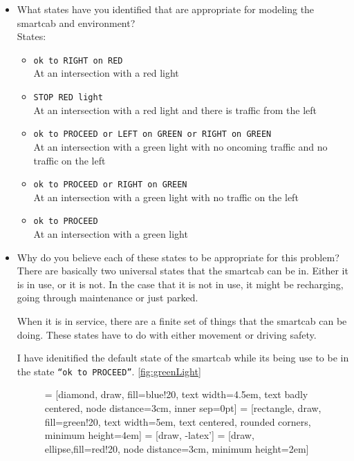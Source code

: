 \documentclass[twoside,openright,titlepage,numbers=noenddot,headinclude,%
               footinclude=true,cleardoublepage=empty,abstractoff,BCOR=5mm,%
               paper=a4,fontsize=11pt,ngerman,american]{scrreprt}
\numberwithin{theorem}{chapter}
\numberwithin{definition}{chapter}
\numberwithin{algorithm}{chapter}
\numberwithin{figure}{chapter}
\numberwithin{table}{chapter}
\numberwithin{equation}{chapter}
\begin{document}
\begin{itemize}
\item What states have you identified that are appropriate for modeling the smartcab and environment?\\
States: 
  \begin{itemize}
    \item \texttt{ok to RIGHT on RED}\\ At an intersection with a red light
    \item \texttt{STOP RED light} \\ At an intersection with a red light and there is traffic from the left
    \item \texttt{ok to PROCEED or LEFT on GREEN or RIGHT on GREEN} \\ At an intersection with a green light with no oncoming traffic and no traffic on the left
    \item \texttt{ok to PROCEED or RIGHT on GREEN} \\At an intersection with a green light with no traffic on the left
    \item \texttt{ok to PROCEED} \\ At an intersection with a green light
   
  \end{itemize}



\item Why do you believe each of these states to be appropriate for this problem?\\

There are basically two universal states that the smartcab can be in. Either it is in use, or it is not. In the case that it is not in use, it might be recharging, going through maintenance or just parked.

When it is in service, there are a finite set of things that the smartcab can be doing. These states have to do with either movement or driving safety.

I have idenitified the default state of the smartcab while its being use to be in the state \texttt{``ok to PROCEED''}. \ref{fig:greenLight}


\begin{figure}
\centering
 = [diamond, draw, fill=blue!20, 
    text width=4.5em, text badly centered, node distance=3cm, inner sep=0pt]
 = [rectangle, draw, fill=green!20, 
    text width=5em, text centered, rounded corners, minimum height=4em]
 = [draw, -latex']
 = [draw, ellipse,fill=red!20, node distance=3cm,
    minimum height=2em]
    

\end{figure}
\end{itemize}
\end{document}
